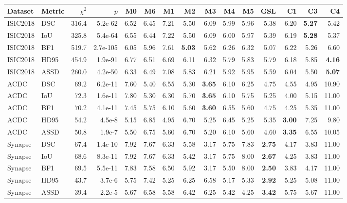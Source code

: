 \begin{tabular}{llrrrrrrrrrrrrr}
\toprule
Dataset & Metric & $\chi^2$ & $p$ & M0 & M6 & M1 & M2 & M3 & M4 & M5 & GSL & C1 & C3 & C4 \\
\midrule
ISIC2018 & DSC & 316.4 & 5.2e-62 & 6.52 & 6.45 & 7.21 & 5.50 & 6.09 & 5.99 & 5.96 & 5.38 & 6.20 & \textbf{5.27} & 5.42 \\
ISIC2018 & IoU & 325.8 & 5.4e-64 & 6.55 & 6.44 & 7.22 & 5.50 & 6.09 & 6.00 & 5.97 & 5.39 & 6.19 & \textbf{5.28} & 5.37 \\
ISIC2018 & BF1 & 519.7 & 2.7e-105 & 6.05 & 5.96 & 7.61 & \textbf{5.03} & 5.62 & 6.26 & 6.32 & 5.07 & 6.22 & 5.26 & 6.60 \\
ISIC2018 & HD95 & 454.9 & 1.9e-91 & 6.77 & 6.51 & 6.69 & 6.11 & 6.32 & 5.79 & 5.83 & 5.79 & 6.18 & 5.85 & \textbf{4.16} \\
ISIC2018 & ASSD & 260.0 & 4.2e-50 & 6.33 & 6.49 & 7.08 & 5.83 & 6.21 & 5.92 & 5.95 & 5.59 & 6.04 & 5.50 & \textbf{5.07} \\
ACDC & DSC & 69.2 & 6.2e-11 & 7.60 & 5.40 & 6.55 & 5.30 & \textbf{3.65} & 6.10 & 6.25 & 4.75 & 4.55 & 4.95 & 10.90 \\
ACDC & IoU & 72.3 & 1.6e-11 & 7.80 & 5.30 & 6.30 & 5.70 & \textbf{3.65} & 6.10 & 5.75 & 5.25 & 4.00 & 5.15 & 11.00 \\
ACDC & BF1 & 70.2 & 4.1e-11 & 7.45 & 5.75 & 6.10 & 5.60 & \textbf{3.60} & 6.55 & 5.60 & 4.75 & 4.25 & 5.35 & 11.00 \\
ACDC & HD95 & 54.2 & 4.5e-8 & 5.15 & 6.85 & 4.95 & 6.70 & 5.25 & 6.45 & 5.25 & 5.35 & \textbf{3.00} & 7.25 & 9.80 \\
ACDC & ASSD & 50.8 & 1.9e-7 & 5.50 & 6.75 & 5.60 & 6.70 & 5.20 & 6.10 & 5.60 & 4.60 & \textbf{3.35} & 6.55 & 10.05 \\
Synapse & DSC & 67.4 & 1.4e-10 & 7.92 & 7.67 & 6.33 & 5.58 & 3.17 & 5.75 & 7.83 & \textbf{2.75} & 4.17 & 3.83 & 11.00 \\
Synapse & IoU & 68.6 & 8.3e-11 & 7.92 & 7.67 & 6.33 & 5.42 & 3.17 & 5.75 & 8.00 & \textbf{2.67} & 4.25 & 3.83 & 11.00 \\
Synapse & BF1 & 69.5 & 5.5e-11 & 7.83 & 7.58 & 6.50 & 5.92 & 3.17 & 5.50 & 8.00 & \textbf{2.50} & 3.83 & 4.17 & 11.00 \\
Synapse & HD95 & 43.7 & 3.7e-6 & 5.75 & 7.42 & 5.25 & 6.25 & 6.58 & 5.17 & 5.33 & \textbf{2.92} & 5.25 & 5.08 & 11.00 \\
Synapse & ASSD & 39.4 & 2.2e-5 & 5.67 & 6.58 & 5.58 & 6.42 & 6.25 & 5.42 & 4.25 & \textbf{3.42} & 5.75 & 5.67 & 11.00 \\
\bottomrule
\end{tabular}
